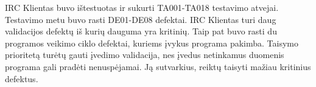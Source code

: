 
IRC Klientas buvo ištestuotas ir sukurti TA001-TA018 testavimo atvejai.
Testavimo metu buvo rasti DE01-DE08 defektai.
IRC Klientas turi daug validacijos defektų iš kurių dauguma yra kritinių.
Taip pat buvo rasti du programos veikimo ciklo defektai, kuriems įvykus programa pakimba.
Taisymo prioritetą turėtų gauti įvedimo validacija, nes įvedus netinkamus duomenis programa gali pradėti nenuspėjamai.
Ją sutvarkius, reiktų taisyti mažiau kritinius defektus.